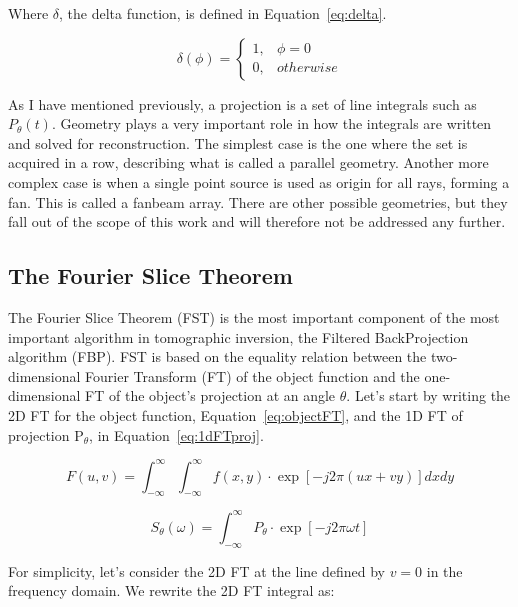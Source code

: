 Where $\delta$, the delta function, is defined in
Equation~\ref{eq:delta}.

\begin{equation}
    \label{eq:delta}
    \delta (\phi) =  
    \begin{cases}
            1, & \phi = 0\\
            0, & otherwise
    \end{cases}
\end{equation}

As I have mentioned previously, a projection is a set of line integrals
such as $P_{\theta}(t)$. Geometry plays a very important role in how the
integrals are written and solved for reconstruction. The simplest case
is the one where the set is acquired in a row, describing what is called
a parallel geometry. Another more complex case is when a single point
source is used as origin for all rays, forming a fan. This is called a
fanbeam array. There are other possible geometries, but they fall out of
the scope of this work and will therefore not be addressed any further.

\subsection{The Fourier Slice Theorem}%
\label{sub:the_fourier_slice_theorem}

The Fourier Slice Theorem (\gls{FST}) is the most important component of
the most important algorithm in tomographic inversion, the Filtered
BackProjection algorithm (\gls{FBP}). \gls{FST} is based on the equality
relation between the 
two-dimensional Fourier Transform (\gls{FT}) of the object function and
the one-dimensional \gls{FT} of the object's projection at an angle
$\theta$. Let's start by writing the 2D \gls{FT} for the object
function, Equation~\ref{eq:objectFT}, and the 1D \gls{FT} of projection
P$_\theta$, in Equation~\ref{eq:1dFTproj}.

\begin{equation}
    \label{eq:objectFT}
    F(u, v) = \int_{-\infty}^{\infty} \int_{-\infty}^{\infty} f(x, y)
    \cdot \exp \left [ -j2\pi (ux + vy) \right ] dx dy 
\end{equation}

\begin{equation}
    \label{eq:1dFTproj}
    S_{\theta}(\omega) = \int_{-\infty}^{\infty} P_{\theta} \cdot \exp\left[
    -j2 \pi \omega t \right]
\end{equation}

For simplicity, let's consider the 2D \gls{FT} at the line defined by
$v=0$ in the frequency domain. We rewrite the 2D \gls{FT} integral as:

